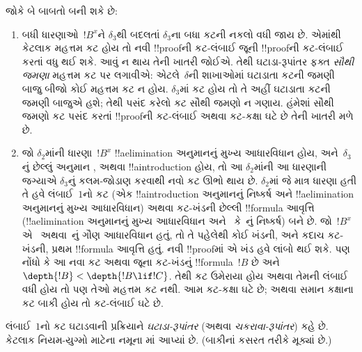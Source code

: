 \documentclass[../../../include/open-logic-section]{subfiles}
\begin{document}
જોકે બે બાબતો
બની શકે છે:
\begin{enumerate}
  \item બધી
  ધારણાઓ~$!B^x$ને
  $\delta_3$થી બદલતાં
  $\delta_3$ના બધા
  કટની નકલો વધી
  જાય છે. એમાંથી
  કેટલાક મહત્તમ
  કટ હોય તો
  નવી !!{proof}ની
  કટ-લંબાઈ જૂની
  !!{proof}ની કટ-લંબાઈ
  કરતાં વધુ થઈ
  શકે. આવું
  ન થાય તેની
  ખાતરી જોઈએ.
  તેથી ઘટાડા-રૂપાંતર
  ફક્ત \emph{સૌથી
  જમણા} મહત્તમ
  કટ પર લગાવીએ:
  એટલે~$\delta$ની
  શાખાઓમાં ઘટાડાતા
  કટની જમણી બાજુ
  બીજો કોઈ
  મહત્તમ કટ ન
  હોય. $\delta_3$માં
  કટ હોય તો
  તે અહીં ઘટાડાતા
  કટની જમણી
  બાજુએ હશે;
  તેથી પસંદ કરેલો
  કટ સૌથી જમણો
  ન ગણાય. હંમેશાં
  સૌથી જમણો
  કટ પસંદ કરતાં
  !!{proof}ની
  કટ-લંબાઈ અથવા
  કટ-કક્ષા ઘટે
  છે તેની ખાતરી
  મળે છે.
  \item જો
  $\delta_2$માંની
  ધારણા~$!B^x$
  !!a{elimination}
  અનુમાનનું મુખ્ય
  આધારવિધાન હોય,
  અને~$\delta_3$નું
  છેલ્લું અનુમાન
  \Elim{\lor},
  \Elim{\lexists}
  અથવા !!a{introduction}
  હોય, તો આ
  $\delta_2$માંની આ
  ધારણાની જગ્યાએ
  $\delta_3$નું
  કલમ-જોડાણ
  કરવાથી નવો
  કટ ઊભો થાય
  છે. $\delta_2$માં
  જે માત્ર ધારણા
  હતી તે હવે
  લંબાઈ~$1$નો
  કટ (એક
  !!a{introduction}
  અનુમાનનું નિષ્કર્ષ
  અને !!a{elimination}
  અનુમાનનું મુખ્ય
  આધારવિધાન) અથવા
  કટ-ખંડની
  છેલ્લી !!{formula}
  આવૃત્તિ
  (!!a{elimination}
  અનુમાનનું
  મુખ્ય આધારવિધાન
  અને~\Elim{\lor}
  કે~\Elim{\lexists}નું
  નિષ્કર્ષ) બને
  છે. જો~$!B^x$
  એ~\Elim{\lor}
  અથવા~\Elim{\lexists}નું
  ગૌણ આધારવિધાન
  હતું, તો તે
  પહેલેથી કોઈ
  ખંડની, અને
  કદાચ કટ-ખંડની,
  પ્રથમ !!{formula}
  આવૃત્તિ હતું.
  નવી !!{proof}માં
  એ ખંડ હવે
  લાંબો થઈ શકે.
  પણ નોંધો કે
  આ નવા કટ
  અથવા જૂના
  કટ-ખંડનું
  !!{formula}~$!B$
  છે અને
  $\depth{!B} < \depth{!B \lif !C}$.
  તેથી કટ ઉમેરાયા
  હોય અથવા તેમની
  લંબાઈ વધી હોય
  તો પણ તેઓ
  મહત્તમ કટ નથી.
  આમ કટ-કક્ષા
  ઘટે છે; અથવા
  સમાન કક્ષાના
  કટ બાકી હોય
  તો કટ-લંબાઈ
  ઘટે છે.
\end{enumerate}

લંબાઈ~$1$નો
કટ ઘટાડવાની
પ્રક્રિયાને
\emph{ઘટાડા-રૂપાંતર}
(અથવા
\emph{ચકરાવા-રૂપાંતર})
કહે છે.
કેટલાક નિયમ-યુગ્મો
માટેના નમૂના
માં
આપ્યાં છે.
(બાકીનાં કસરત
તરીકે મૂક્યાં છે.)
\end{document}
